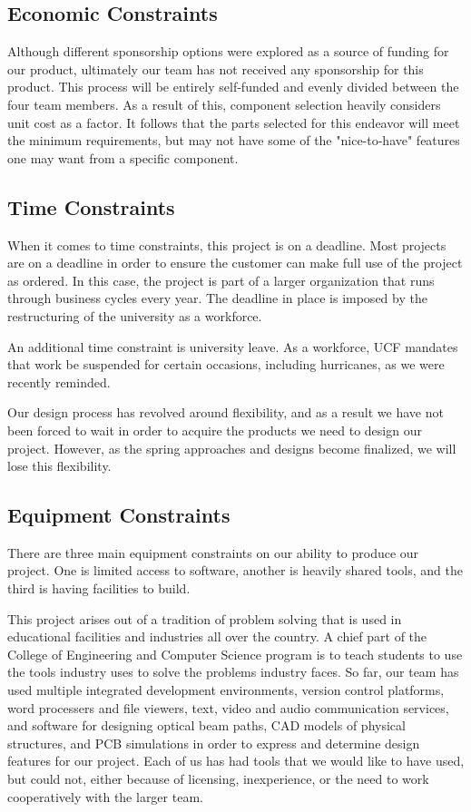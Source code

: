 \subsection{Economic Constraints}
Although different sponsorship options were explored as a source of
funding for our product, ultimately our team has not received any
sponsorship for this product. This process will be entirely
self-funded and evenly divided between the four team members. As a
result of this, component selection heavily considers unit cost as a
factor. It follows that the parts selected for this endeavor will meet
the minimum requirements, but may not have some of the "nice-to-have"
features one may want from a specific component. 
\subsection{Time Constraints}

When it comes to time constraints, this project is on a deadline. Most projects are on a deadline in order to ensure the customer can make full use of the project as ordered. In this case, the project is part of a larger organization that runs through business cycles every year. The deadline in place is imposed by the restructuring of the university as a workforce.

An additional time constraint is university leave. As a workforce, UCF mandates that work be suspended for certain occasions, including hurricanes, as we were recently reminded.

Our design process has revolved around flexibility, and as a result we have not been forced to wait in order to acquire the products we need to design our project. However, as the spring approaches and designs become finalized, we will lose this flexibility. 

\subsection{Equipment Constraints}
There are three main equipment constraints on our ability to produce our project. One is limited access to software, another is heavily shared tools, and the third is having facilities to build.

This project arises out of a tradition of problem solving that is used in educational facilities and industries all over the country. A chief part of the College of Engineering and Computer Science program is to teach students to use the tools industry uses to solve the problems industry faces. So far, our team has used multiple integrated development environments, version control platforms, word processers and file viewers, text, video and audio communication services, and software for designing optical beam paths, CAD models of physical structures, and PCB simulations in order to express and determine design features for our project. Each of us has had tools that we would like to have used, but could not, either because of licensing, inexperience, or the need to work cooperatively with the larger team. 


